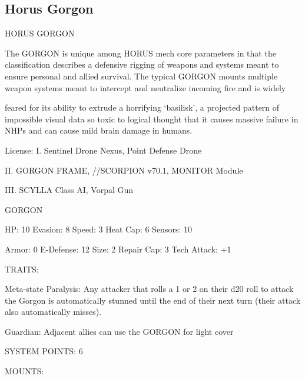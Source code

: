 \subsection{Horus Gorgon}

                                                                                                                           
                                              HORUS GORGON  

The GORGON is unique among HORUS mech core parameters in that the classification describes a  
defensive rigging of weapons and systems meant to ensure personal and allied survival. The typical  
GORGON mounts multiple weapon systems meant to intercept and neutralize incoming fire and is widely  

feared for its ability to extrude a horrifying ‘basilisk’, a projected pattern of impossible visual data so toxic to  
logical thought that it causes massive failure in NHPs and can cause mild brain damage in humans.  

                                                                                                                      


                                                   License:  
I. Sentinel Drone Nexus, Point Defense Drone
 
II. GORGON FRAME,  //SCORPION v70.1, MONITOR Module
 
III. SCYLLA Class AI, Vorpal Gun
 

                                                 GORGON 

 HP: 10         Evasion: 8                            Speed: 3            Heat Cap: 6        Sensors: 10 

 Armor: 0       E-Defense: 12                         Size: 2             Repair Cap: 3      Tech Attack:  
                                                                                             +1 

                                                   TRAITS: 

 Meta-state Paralysis: Any attacker that rolls a 1 or 2 on their d20 roll to attack the Gorgon is  
 automatically stunned until the end of their next turn (their attack also automatically misses).
 
 Guardian: Adjacent allies can use the GORGON for light cover 

                                             SYSTEM POINTS: 6 

                                                  MOUNTS: 

